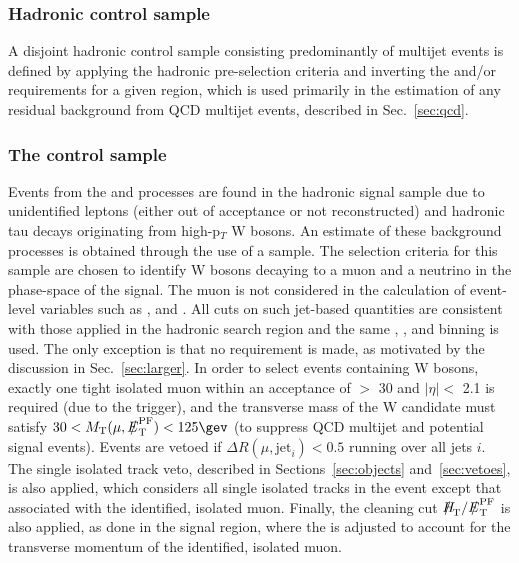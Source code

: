 \subsubsection{Hadronic control sample}

A disjoint hadronic control sample consisting predominantly of
multijet events is defined by applying the hadronic pre-selection
criteria and inverting the \alphat and/or \mhtmet requirements for a
given \scalht region, which is used primarily in the estimation of any
residual background from QCD multijet events, described in
Sec.~\ref{sec:qcd}.

\subsubsection{The \texorpdfstring{\mj}{muon plus jets} control sample}
\label{sec:mucontrolSelection}

Events from the \wj and \ttbar processes are found in the hadronic
signal sample due to unidentified leptons (either out of acceptance or
not reconstructed) and hadronic tau decays originating from
high-p$_{T}$ W bosons. An estimate of these background processes is
obtained through the use of a \mj sample. The selection criteria for
this sample are chosen to identify W bosons decaying to a muon and a
neutrino in the phase-space of the signal. The muon is not considered
in the calculation of event-level variables such as \scalht, \mht and
\alphat. All cuts on such jet-based quantities are consistent with
those applied in the hadronic search region and the same \njet, \nb,
and \scalht binning is used. The only exception is that no \alphat
requirement is made, as motivated by the discussion in
Sec.~\ref{sec:larger}. In order to select events containing W bosons,
exactly one tight isolated muon within an acceptance of \PT $>$ 30
\gev and $|\eta| <$ 2.1 is required (due to the trigger), and the
transverse mass of the W candidate must satisfy $30 < \mt(\mu,\pfmet)
< 125\gev$ (to suppress QCD multijet and potential signal
events). Events are vetoed if $\Delta R(\mu,\textrm{jet}_i) < 0.5$
running over all jets $i$. The single isolated track veto, described
in Sections~\ref{sec:objects} and~\ref{sec:vetoes}, is also
applied, which considers all single isolated tracks in the event
except that associated with the identified, isolated muon. Finally,
the cleaning cut $\mht/\pfmet$ is also applied, as done in the signal
region, where the \pfmet is adjusted to account for the transverse
momentum of the identified, isolated muon.

